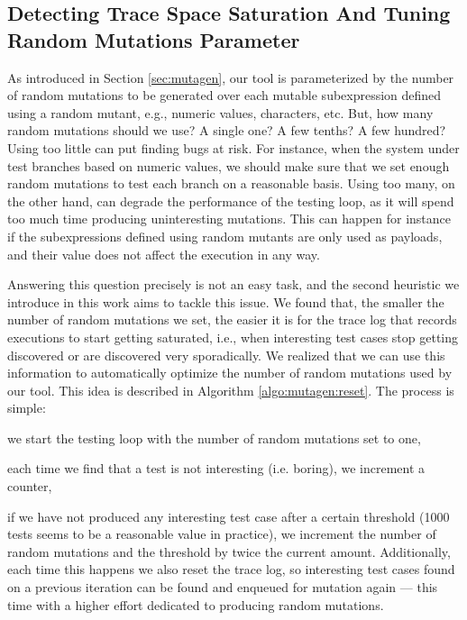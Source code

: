 \documentclass[acmsmall, anonymous]{acmart}
\begin{document}
\subsection{Detecting Trace Space Saturation And Tuning Random Mutations Parameter}

As introduced in Section \ref{sec:mutagen}, our tool is parameterized by the
number of random mutations to be generated over each mutable subexpression
defined using a random mutant, e.g., numeric values, characters, etc.
%
But, how many random mutations should we use? A single one? A few tenths? A few
hundred?
%
Using too little can put finding bugs at risk.
%
For instance, when the system under test branches based on numeric values, we
should make sure that we set enough random mutations to test each branch on a
reasonable basis.
%
Using too many, on the other hand, can degrade the performance of the testing
loop, as it will spend too much time producing uninteresting mutations.
%
This can happen for instance if the subexpressions defined using random mutants
are only used as payloads, and their value does not affect the execution in any
way.


Answering this question precisely is not an easy task, and the second heuristic
we introduce in this work aims to tackle this issue.
%
We found that, the smaller the number of random mutations we set, the easier it
is for the trace log that records executions to start getting saturated, i.e.,
when interesting test cases stop getting discovered or are discovered very
sporadically.
%
We realized that we can use this information to automatically optimize the
number of random mutations used by our tool.
%
This idea is described in Algorithm \ref{algo:mutagen:reset}.
%
The process is simple:
%
\begin{inparaenum}
  \item we start the testing loop with the number of random mutations set to
    one,
  \item each time we find that a test is not interesting (i.e. boring), we
    increment a counter,
  \item if we have not produced any interesting test case after a certain
    threshold (1000 tests seems to be a reasonable value in practice), we
    increment the number of random mutations and the threshold by twice the
    current amount.
    Additionally, each time this happens we also reset the trace log, so
    interesting test cases found on a previous iteration can be found and
    enqueued for mutation again --- this time with a higher effort dedicated to
    producing random mutations.
\end{inparaenum}
\end{document}
